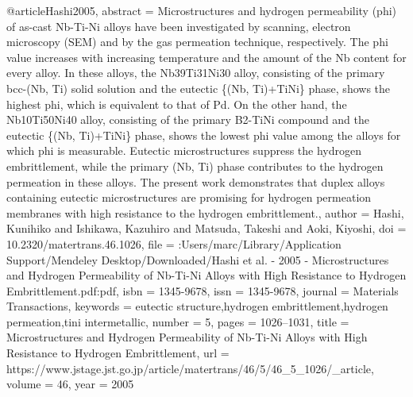 @article{Hashi2005,
abstract = {Microstructures and hydrogen permeability (phi) of as-cast Nb-Ti-Ni alloys have been investigated by scanning, electron microscopy (SEM) and by the gas permeation technique, respectively. The phi value increases with increasing temperature and the amount of the Nb content for every alloy. In these alloys, the Nb39Ti31Ni30 alloy, consisting of the primary bcc-(Nb, Ti) solid solution and the eutectic {\{}(Nb, Ti)+TiNi{\}} phase, shows the highest phi, which is equivalent to that of Pd. On the other hand, the Nb10Ti50Ni40 alloy, consisting of the primary B2-TiNi compound and the eutectic {\{}(Nb, Ti)+TiNi{\}} phase, shows the lowest phi value among the alloys for which phi is measurable. Eutectic microstructures suppress the hydrogen embrittlement, while the primary (Nb, Ti) phase contributes to the hydrogen permeation in these alloys. The present work demonstrates that duplex alloys containing eutectic microstructures are promising for hydrogen permeation membranes with high resistance to the hydrogen embrittlement.},
author = {Hashi, Kunihiko and Ishikawa, Kazuhiro and Matsuda, Takeshi and Aoki, Kiyoshi},
doi = {10.2320/matertrans.46.1026},
file = {:Users/marc/Library/Application Support/Mendeley Desktop/Downloaded/Hashi et al. - 2005 - Microstructures and Hydrogen Permeability of Nb-Ti-Ni Alloys with High Resistance to Hydrogen Embrittlement.pdf:pdf},
isbn = {1345-9678},
issn = {1345-9678},
journal = {Materials Transactions},
keywords = {eutectic structure,hydrogen embrittlement,hydrogen permeation,tini intermetallic},
number = {5},
pages = {1026--1031},
title = {{Microstructures and Hydrogen Permeability of Nb-Ti-Ni Alloys with High Resistance to Hydrogen Embrittlement}},
url = {https://www.jstage.jst.go.jp/article/matertrans/46/5/46{\_}5{\_}1026/{\_}article},
volume = {46},
year = {2005}
}
